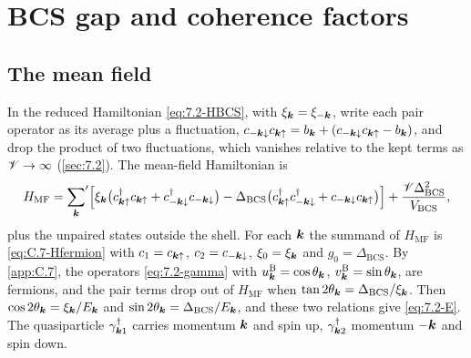 \section{BCS gap and coherence factors}\label{app:D.20}

\subsection*{The mean field}

In the reduced Hamiltonian \cref{eq:7.2-HBCS}, with $\xi_{\bm{k}} = \xi_{-\bm{k}}$, write each pair operator as its average plus a fluctuation, $c_{-\bm{k}\downarrow}c_{\bm{k}\uparrow} = b_{\bm{k}} + (c_{-\bm{k}\downarrow}c_{\bm{k}\uparrow} - b_{\bm{k}})$, and drop the product of two fluctuations, which vanishes relative to the kept terms as $\mathscr{V} \to \infty$ (\cref{sec:7.2}). The mean-field Hamiltonian is
\begin{equation*}
  H_{\mathrm{MF}} = {\sum_{\bm{k}}}'\Bigl[\xi_{\bm{k}}\bigl(c^\dagger_{\bm{k}\uparrow}c_{\bm{k}\uparrow} + c^\dagger_{-\bm{k}\downarrow}c_{-\bm{k}\downarrow}\bigr) - \Delta_{\mathrm{BCS}}\bigl(c^\dagger_{\bm{k}\uparrow}c^\dagger_{-\bm{k}\downarrow} + c_{-\bm{k}\downarrow}c_{\bm{k}\uparrow}\bigr)\Bigr] + \frac{\mathscr{V}\Delta_{\mathrm{BCS}}^2}{V_{\mathrm{BCS}}} ,
\end{equation*}
plus the unpaired states outside the shell. For each $\bm{k}$ the summand of $H_{\mathrm{MF}}$ is \cref{eq:C.7-Hfermion} with $c_1 = c_{\bm{k}\uparrow}$, $c_2 = c_{-\bm{k}\downarrow}$, $\xi_0 = \xi_{\bm{k}}$ and $g_0 = \Delta_{\mathrm{BCS}}$. By \cref{app:C.7}, the operators \cref{eq:7.2-gamma} with $u^{\mathrm{B}}_{\bm{k}} = \cos\theta_{\bm{k}}$, $v^{\mathrm{B}}_{\bm{k}} = \sin\theta_{\bm{k}}$, are fermions, and the pair terms drop out of $H_{\mathrm{MF}}$ when $\tan2\theta_{\bm{k}} = \Delta_{\mathrm{BCS}}/\xi_{\bm{k}}$. Then $\cos2\theta_{\bm{k}} = \xi_{\bm{k}}/E_{\bm{k}}$ and $\sin2\theta_{\bm{k}} = \Delta_{\mathrm{BCS}}/E_{\bm{k}}$, and these two relations give \cref{eq:7.2-E}. The quasiparticle $\gamma^\dagger_{\bm{k}1}$ carries momentum $\bm{k}$ and spin up, $\gamma^\dagger_{\bm{k}2}$ momentum $-\bm{k}$ and spin down.

